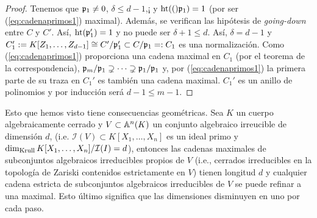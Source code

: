 \documentclass[../main.tex]{subfiles}
\begin{document}
\begin{proof}
	Tenemos que $\mathfrak{p}_1\neq 0$, $\delta\le d-1$,¡ y $\operatorname{ht}(()\mathfrak{p}_1)=1$ (por ser (\ref{eq:cadenaprimos1}) maximal). Además, se verifican las hipótesis de \textit{going-down} entre $C$ y $C'.$ Así, $\operatorname{ht}(\mathfrak{p}_1')=1$ y no puede ser $\delta+1\le d.$ Así, $\delta=d-1$ y $C_1':=K[Z_1,\dots, Z_{d-1}]\cong C'/\mathfrak{p}_1'\subset C/\mathfrak{p}_1=:C_1$ es una normalización. Como (\ref{eq:cadenaprimos1}) proporciona una cadena maximal en $C_1$ (por el teorema de la correspondencia), $\mathfrak{p}_m/\mathfrak{p}_1\supsetneq\cdots\supsetneq\mathfrak{p}_1/\mathfrak{p}_1$ y, por (\ref{eq:cadenaprimos1}) la primera parte de su traza en $C_1'$ es también una cadena maximal. $C_1'$ es un anillo de polinomios y por inducción será $d-1\le m-1.$
\end{proof}

Esto que hemos visto tiene consecuencias geométricas. Sea $K$ un cuerpo algebraicamente cerrado y $V\subset \mathbb{A}^n(K)$ un conjunto algebraico irreucible de dimensión $d$, (i.e. $\mathcal{I}(V)\subset K[X_1,\dots,X_n]$ es un ideal primo y $\dim_{\text{Krull}}{K[X_1,\dots,X_n]/\mathcal{I}(I)}=d$), entonces las cadenas maximales de subconjuntos algebraicos irreducibles propios de $V$ (i.e., cerrados irreducibles en la topología de Zariski contenidos estrictamente en $V$) tienen longitud $d$ y cualquier cadena estricta de subconjuntos algebraicos irreducibles de $V$ se puede refinar a una maximal. Esto último significa que las dimensiones disminuyen en uno por cada paso.
\end{document}
